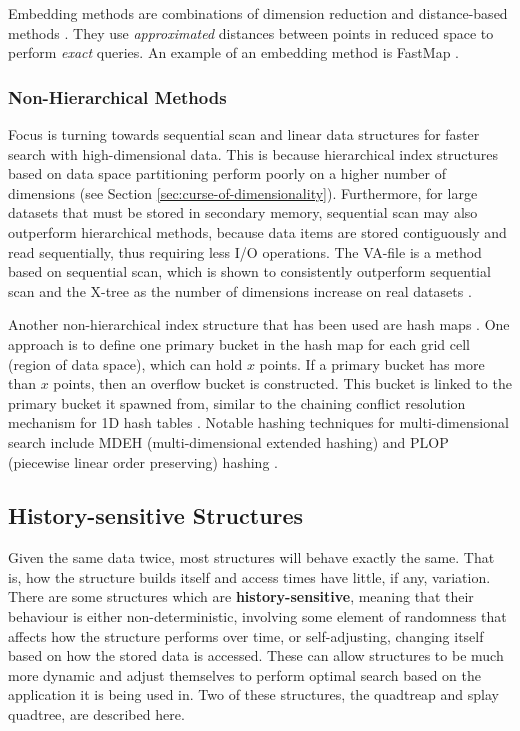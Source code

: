Embedding methods are combinations of dimension reduction and distance-based methods \cite{md-structures-samet}. They use \textit{approximated} distances between points in reduced space to perform \textit{exact} queries. An example of an embedding method is FastMap \cite{fast-map}.

\subsubsection{Non-Hierarchical Methods}

Focus is turning towards sequential scan and linear data structures for faster search with high-dimensional data. This is because hierarchical index structures based on data space partitioning perform poorly on a higher number of dimensions (see Section \ref{sec:curse-of-dimensionality}). Furthermore, for large datasets that must be stored in secondary memory, sequential scan may also outperform hierarchical methods, because data items are stored contiguously and read sequentially, thus requiring less I/O operations. The VA-file is a method based on sequential scan, which is shown to consistently outperform sequential scan and the X-tree as the number of dimensions increase on real datasets \cite{va-file}.

Another non-hierarchical index structure that has been used are hash maps \cite{md-structures-samet}. One approach is to define one primary bucket in the hash map for each grid cell (region of data space), which can hold $x$ points. If a primary bucket has more than $x$ points, then an overflow bucket is constructed. This bucket is linked to the primary bucket it spawned from, similar to the chaining conflict resolution mechanism for 1D hash tables \cite{introduction-to-algorithms}. Notable hashing techniques for multi-dimensional search include MDEH (multi-dimensional extended hashing) and PLOP (piecewise linear order preserving) hashing \cite{md-structures-samet}.


\subsection{History-sensitive Structures}
\label{sec:history-sensitive-structures}

Given the same data twice, most structures will behave exactly the same. That is, how the structure builds itself and access times have little, if any, variation. There are some structures which are \textbf{history-sensitive}, meaning that their behaviour is either non-deterministic, involving some element of randomness that affects how the structure performs over time, or self-adjusting, changing itself based on how the stored data is accessed. These can allow structures to be much more dynamic and adjust themselves to perform optimal search based on the application it is being used in. Two of these structures, the quadtreap and splay quadtree, are described here.

